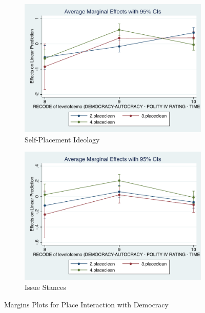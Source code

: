 \documentclass[12pt, titlepage]{article}
\begin{document}
\begin{figure}[H]
	\centering
	\begin{subfigure}[b]{0.475\textwidth}   
		\centering 
		\includegraphics[width=\textwidth]{Margins/IdeoPlaceDem}
		\caption{Self-Placement Ideology}
	\end{subfigure}
	\hfill
	\begin{subfigure}[b]{0.475\textwidth}
		\centering 
		\includegraphics[width=\textwidth]{Margins/LibPlaceDem}
		\caption{Issue Stances}
	\end{subfigure}
	\caption{Margins Plots for Place Interaction with Democracy}
	\label{Democracy}
\end{figure}
\end{document}
